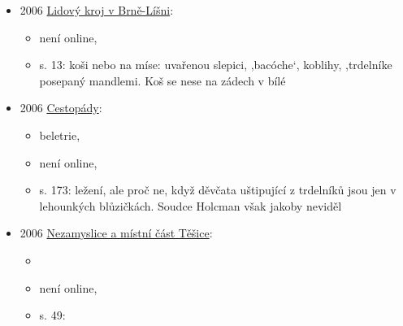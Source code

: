 \begin{itemize}
\begin{itemize}
\begin{itemize}
      \begin{itemize}
      \tightlist
      \item
        trdelníky boli vychýrené, naše ženy boli majstri. Z hruškového
        dreva vyrezali válek, cesto naň natočili, nad ohňom nad pahrebou
        točiac posýpali ho potlčenými orechami a piekli do zlatožlta.
        Bolo to aj vzhľadné aj chuťovo výborné, výdatné pečivo
      \end{itemize}
    \end{itemize}
  \end{itemize}
\item
  2006
  \href{https://www.digitalniknihovna.cz/mzk/uuid/uuid:8d8647d0-6412-11ed-8291-5ef3fc9bb22f}{Lidový
  kroj v Brně-Líšni}:

  \begin{itemize}
  \tightlist
  \item
    není online, 
  \item
    s. 13: koši nebo na míse: uvařenou slepici, ,bacóche`, koblihy,
    ,trdelníke posepaný mandlemi. Koš se nese na zádech v bílé
  \end{itemize}
\item
  2006
  \href{https://www.digitalniknihovna.cz/mzk/uuid/uuid:e5915580-d25d-11ea-9c41-005056827e52}{Cestopády}:

  \begin{itemize}
  \tightlist
  \item
    beletrie, 
  \item
    není online, 
  \item
    s. 173: ležení, ale proč ne, když děvčata uštipující z trdelníků
    jsou jen v lehounkých blůzičkách. Soudce Holcman však jakoby neviděl
  \end{itemize}
\item
  2006
  \href{https://www.digitalniknihovna.cz/mzk/uuid/uuid:39308e00-0970-11e7-9446-005056827e51}{Nezamyslice
  a místní část Těšice}:

  \begin{itemize}
  \tightlist
  \item
     
  \item
    není online,
  \item
    s. 49:


\end{itemize}
\end{itemize}
